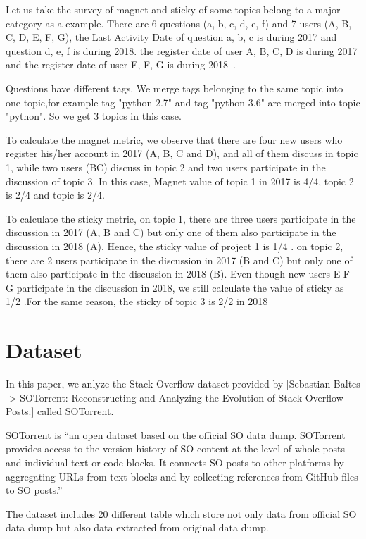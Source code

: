 \documentclass[conference]{IEEEtran}
\begin{document}
Let us take the survey of magnet and sticky of some topics belong to a major category as a example. There are 6 questions (a, b, c, d, e, f) and 7 users (A, B, C, D, E, F, G), the Last Activity Date of question a, b, c is during 2017 and question d, e, f is during 2018. the register date of user A, B, C, D is during 2017 and the register date of user E, F, G is during 2018~\cite{yamashita2016magnet}.

Questions have different tags. We merge tags belonging to the same topic into one topic,for example tag "python-2.7" and tag "python-3.6" are merged into topic "python". So we get 3 topics in this case.

To calculate the magnet metric, we observe that there are four new users who register his/her account in 2017 (A, B, C and D), and all of them discuss in topic 1, while two users (BC) discuss in topic 2 and two users participate in the discussion of topic 3. In this case, Magnet value of topic 1 in 2017 is 4/4, topic 2 is 2/4 and topic is 2/4.

To calculate the sticky metric, on topic 1, there are three users participate in the discussion in 2017 (A, B and C) but only one of them also participate in the discussion in 2018 (A). Hence, the sticky value of project 1 is 1/4 . on topic 2, there are 2 users participate in the discussion in 2017 (B and C) but only one of them also participate in the discussion in 2018 (B). Even though new users E F G participate in the discussion in 2018, we still calculate the value of sticky as 1/2 .For the same reason, the sticky of topic 3 is 2/2 in {2018}


\section{Dataset}
In this paper, we anlyze the Stack Overflow dataset provided by [Sebastian Baltes -> SOTorrent: Reconstructing and Analyzing the Evolution of Stack Overflow Posts.] called SOTorrent. 

SOTorrent is “an open dataset based on the official SO data dump. SOTorrent provides access to the version history of SO content at the level of whole posts and individual text or code blocks. It connects SO posts to other platforms by aggregating URLs from text blocks and by collecting references from GitHub files to SO posts.”

The dataset includes 20 different table which store not only data from official SO data dump but also data extracted from original data dump.
\end{document}
